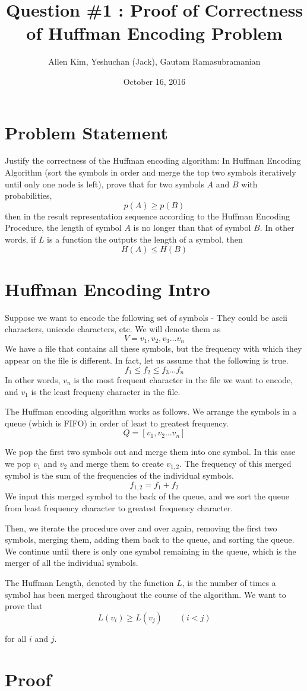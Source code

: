 \documentclass{article}
\title{Question \#1 : Proof of Correctness of Huffman Encoding Problem}
\author{Allen Kim, Yeshuchan (Jack), Gautam Ramasubramanian}
\date{October 16, 2016}
\begin{document}
\maketitle

\section*{Problem Statement}

Justify the correctness of the Huffman encoding algorithm: 
In Huffman Encoding Algorithm (sort the symbols in order and merge the top two symbols iteratively until only one node is left), 
prove that for two symbols $A$ and $B$ with probabilities,
$$
	p(A) \geq p(B)
$$ 
then in the result representation sequence according to the Huffman Encoding Procedure,
the length of symbol $A$ is no longer than that of symbol $B$. In other words, if $L$ is a function the outputs the length of a symbol, then
$$
	H(A) \leq H(B)
$$

\section*{Huffman Encoding Intro}

Suppose we want to encode the following set of symbols - They could be ascii characters, unicode characters, etc. We will denote them as
$$
V = {v_1, v_2, v_3 \ldots v_n}
$$
We have a file that contains all these symbols, but the frequency with which they appear on the file is different. In fact, let us assume that the following is true.
$$
f_1 \leq f_2 \leq f_3 \ldots f_n
$$ 
In other words, $v_n$ is the most frequent character in the file we want to encode, and $v_1$ is the least frequeny character in the file.

The Huffman encoding algorithm works as follows. We arrange the symbols in a queue (which is FIFO) in order of least to greatest frequency.
$$
Q = \left[ v_1, v_2 \ldots v_n \right]
$$ 

We pop the first two symbols out and merge them into one symbol. In this case we pop $v_1$ and $v_2$ and merge them to create $v_{1,2}$. The frequency of this merged symbol is the sum of the frequencies of the individual symbols.
$$
f_{1,2} = f_1 + f_2
$$
We input this merged symbol to the back of the queue, and we sort the queue from least frequency character to greatest frequency character.

Then, we iterate the procedure over and over again, removing the first two symbols, merging them, adding them back to the queue, and sorting the queue. We continue until there is only one symbol remaining in the queue, which is the merger of all the individual symbols.

The Huffman Length, denoted by the function $L$, is the number of times a symbol has been merged throughout the course of the algorithm. We want to prove that
$$ 
L(v_i) \geq L(v_j) \qquad (i < j)
$$

for all $i$ and $j$.

\section{Proof}
\end{document}

